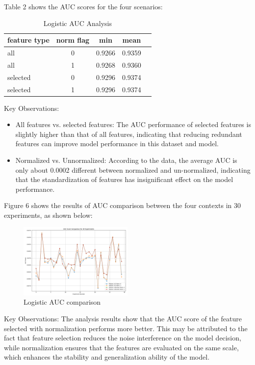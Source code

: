 \documentclass[conference]{IEEEtran}
\begin{document}
Table 2 shows the AUC scores for the four scenarios:

\begin{table}[htbp]
    \centering
    \caption{Logistic AUC Analysis}
    \begin{tabular}{lcccc}
        \toprule
        \textbf{feature type} & \textbf{norm flag} & \textbf{min} & \textbf{mean} \\ \midrule
        all & 0 & 0.9266 & 0.9359 \\
        all & 1 & 0.9268 & 0.9360 \\
        selected & 0 & 0.9296 & 0.9374 \\
        selected & 1 & 0.9296 & 0.9374 \\
        \bottomrule
    \end{tabular}
    \label{tab:logistic_auc_analysis}
\end{table}

Key Observations:
\begin{itemize}
\item All features vs. selected features: The AUC performance of selected features is slightly higher than that of all features, indicating that reducing redundant features can improve model performance in this dataset and model.
\item Normalized vs. Unnormalized: According to the data, the average AUC is only about 0.0002 different between normalized and un-normalized, indicating that the standardization of features has insignificant effect on the model performance.
\end{itemize}

Figure 6 shows the results of AUC comparison between the four contexts in 30 experiments, as shown below:
\begin{figure}[h]
    \centering
    \includegraphics[width=0.5\textwidth]{auc_comp.png} %
    \caption{Logistic AUC comparison}
    \label{fig:example1_image}
\end{figure}

Key Observations:
The analysis results show that the AUC score of the feature selected with normalization performs more better. This may be attributed to the fact that feature selection reduces the noise interference on the model decision, while normalization ensures that the features are evaluated on the same scale, which enhances the stability and generalization ability of the model.
\end{document}
